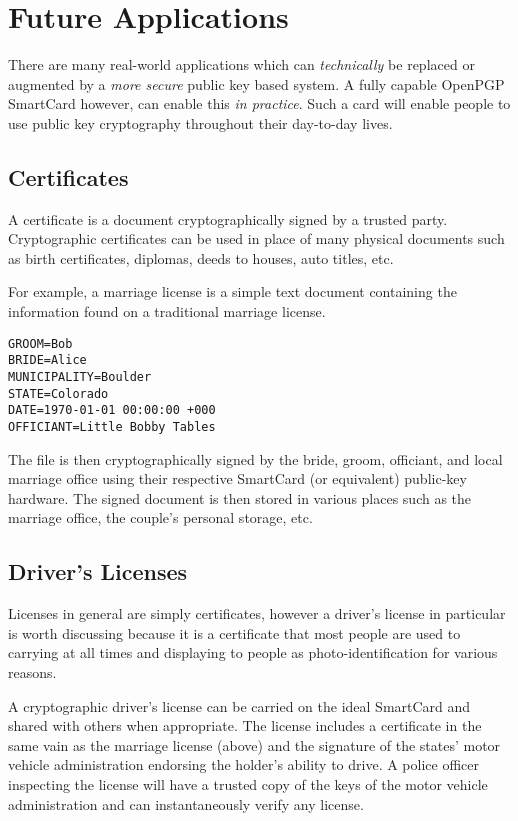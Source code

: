 \documentclass[11pt, twocolumn]{article}
\begin{document}
\section{Future Applications}
\label{sec:future}

There are many real-world applications which can \textit{technically} be
replaced or augmented by a \textit{more secure} public key based system. A fully
capable OpenPGP SmartCard however, can enable this \textit{in practice}. Such a
card will enable people to use public key cryptography throughout their
day-to-day lives.

\subsection{Certificates}

A certificate is a document cryptographically signed by a trusted party.
Cryptographic certificates can be used in place of many physical documents such
as birth certificates, diplomas, deeds to houses, auto titles, etc.

For example, a marriage license is a simple text document containing the
information found on a traditional marriage license.

\begin{verbatim}
GROOM=Bob
BRIDE=Alice
MUNICIPALITY=Boulder
STATE=Colorado
DATE=1970-01-01 00:00:00 +000
OFFICIANT=Little Bobby Tables
\end{verbatim}

The file is then cryptographically signed by the bride, groom, officiant, and
local marriage office using their respective SmartCard (or equivalent)
public-key hardware. The signed document is then stored in various places such
as the marriage office, the couple's personal storage, etc.

\subsection{Driver's Licenses}

Licenses in general are simply certificates, however a driver's license
in particular is worth discussing because it is a certificate that most people
are used to carrying at all times and displaying to people as
photo-identification for various reasons.

A cryptographic driver's license can be carried on the ideal SmartCard and
shared with others when appropriate. The license includes a certificate in the
same vain as the marriage license (above) and the signature of the states' motor
vehicle administration endorsing the holder's ability to drive. A police officer
inspecting the license will have a trusted copy of the keys of the motor vehicle
administration and can instantaneously verify any license.
\end{document}
